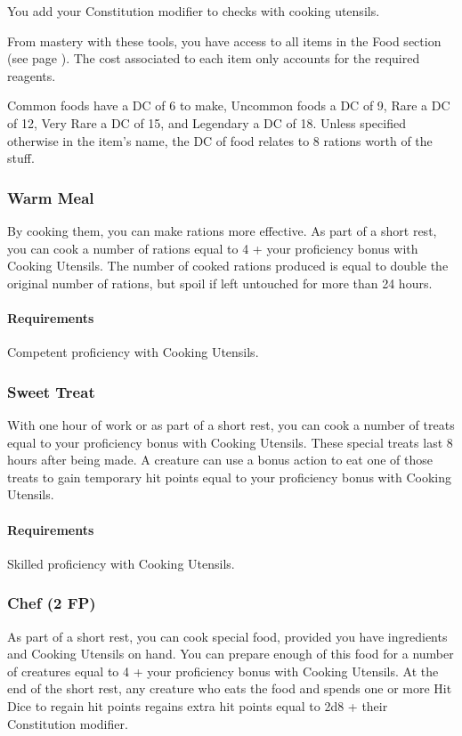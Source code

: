     You add your Constitution modifier to checks with cooking utensils.

    From mastery with these tools, you have access to all items in the Food section (see page \pageref{ssec::food}).
    The cost associated to each item only accounts for the required reagents.

    Common foods have a DC of 6 to make, Uncommon foods a DC of 9, Rare a DC of 12, Very Rare a DC of 15, and Legendary a DC of 18.
    Unless specified otherwise in the item's name, the DC of food relates to 8 rations worth of the stuff.
\subsubsection{Warm Meal} \label{feat::warmmeal}
    By cooking them, you can make rations more effective.
    As part of a short rest, you can cook a number of rations equal to 4 + your proficiency bonus with Cooking Utensils.
    The number of cooked rations produced is equal to double the original number of rations, but spoil if left untouched for more than 24 hours.
    \paragraph{Requirements} Competent proficiency with Cooking Utensils.
\subsubsection{Sweet Treat} \label{feat::sweettreat}
    With one hour of work or as part of a short rest, you can cook a number of treats equal to your proficiency bonus with Cooking Utensils.
    These special treats last 8 hours after being made.
    A creature can use a bonus action to eat one of those treats to gain temporary hit points equal to your proficiency bonus with Cooking Utensils.
    \paragraph{Requirements} Skilled proficiency with Cooking Utensils.
\subsubsection{Chef (2 FP)} \label{feat::chef}
    As part of a short rest, you can cook special food, provided you have ingredients and Cooking Utensils on hand.
    You can prepare enough of this food for a number of creatures equal to 4 + your proficiency bonus with Cooking Utensils.
    At the end of the short rest, any creature who eats the food and spends one or more Hit Dice to regain hit points regains extra hit points equal to 2d8 + their Constitution modifier.
